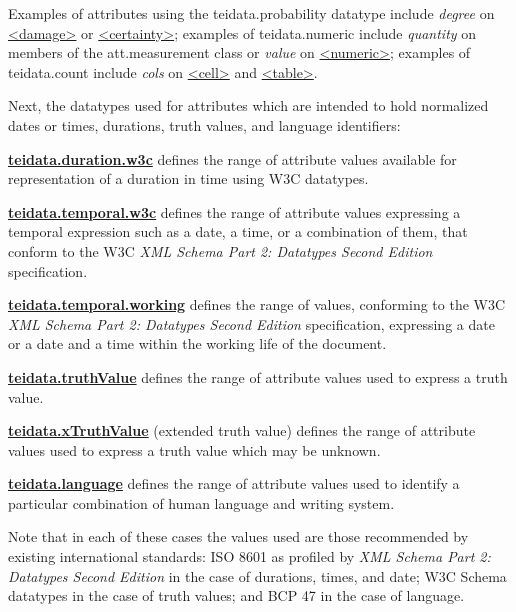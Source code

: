 \par
Examples of attributes using the \textsf{teidata.probability} datatype include {\itshape degree} on \hyperref[TEI.damage]{<damage>} or \hyperref[TEI.certainty]{<certainty>}; examples of \textsf{teidata.numeric} include {\itshape quantity} on members of the \textsf{att.measurement} class or {\itshape value} on \hyperref[TEI.numeric]{<numeric>}; examples of \textsf{teidata.count} include {\itshape cols} on \hyperref[TEI.cell]{<cell>} and \hyperref[TEI.table]{<table>}.\par
Next, the datatypes used for attributes which are intended to hold normalized dates or times, durations, truth values, and language identifiers: 
\begin{sansreflist}
  
\item {\bfseries \hyperref[TEI.teidata.duration.w3c]{teidata.duration.w3c}} defines the range of attribute values available for representation of a duration in time using W3C datatypes.
\item {\bfseries \hyperref[TEI.teidata.temporal.w3c]{teidata.temporal.w3c}} defines the range of attribute values expressing a temporal expression such as a date, a time, or a combination of them, that conform to the W3C \textit{XML Schema Part 2: Datatypes Second Edition} specification.
\item {\bfseries \hyperref[TEI.teidata.temporal.working]{teidata.temporal.working}} defines the range of values, conforming to the W3C \textit{XML Schema Part 2: Datatypes Second Edition} specification, expressing a date or a date and a time within the working life of the document.
\item {\bfseries \hyperref[TEI.teidata.truthValue]{teidata.truthValue}} defines the range of attribute values used to express a truth value.
\item {\bfseries \hyperref[TEI.teidata.xTruthValue]{teidata.xTruthValue}} (extended truth value) defines the range of attribute values used to express a truth value which may be unknown.
\item {\bfseries \hyperref[TEI.teidata.language]{teidata.language}} defines the range of attribute values used to identify a particular combination of human language and writing system.
\end{sansreflist}
\par
Note that in each of these cases the values used are those recommended by existing international standards: ISO 8601 as profiled by \textit{XML Schema Part 2: Datatypes Second Edition} in the case of durations, times, and date; W3C Schema datatypes in the case of truth values; and BCP 47 in the case of language.\par

